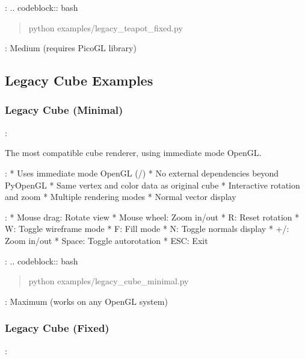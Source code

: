 \documentclass[a4paper,10pt,english,openany,oneside]{sphinxmanual}
\begin{document}
\sphinxAtStartPar
{}:
.. code\sphinxhyphen{}block:: bash
\begin{quote}

\sphinxAtStartPar
python examples/legacy\_teapot\_fixed.py
\end{quote}

\sphinxAtStartPar
{}: Medium (requires PicoGL library)


\subsection{Legacy Cube Examples}
\label{\detokenize{legacy_examples:legacy-cube-examples}}

\subsubsection{Legacy Cube (Minimal)}
\label{\detokenize{legacy_examples:legacy-cube-minimal}}
\sphinxAtStartPar
{}: 

\sphinxAtStartPar
The most compatible cube renderer, using immediate mode OpenGL.

\sphinxAtStartPar
{}:
* Uses immediate mode OpenGL (/)
* No external dependencies beyond PyOpenGL
* Same vertex and color data as original cube
* Interactive rotation and zoom
* Multiple rendering modes
* Normal vector display

\sphinxAtStartPar
{}:
* Mouse drag: Rotate view
* Mouse wheel: Zoom in/out
* R: Reset rotation
* W: Toggle wireframe mode
* F: Fill mode
* N: Toggle normals display
* +/\sphinxhyphen{}: Zoom in/out
* Space: Toggle auto\sphinxhyphen{}rotation
* ESC: Exit

\sphinxAtStartPar
{}:
.. code\sphinxhyphen{}block:: bash
\begin{quote}

\sphinxAtStartPar
python examples/legacy\_cube\_minimal.py
\end{quote}

\sphinxAtStartPar
{}: Maximum (works on any OpenGL system)


\subsubsection{Legacy Cube (Fixed)}
\label{\detokenize{legacy_examples:legacy-cube-fixed}}
\sphinxAtStartPar
{}: 
\end{document}
